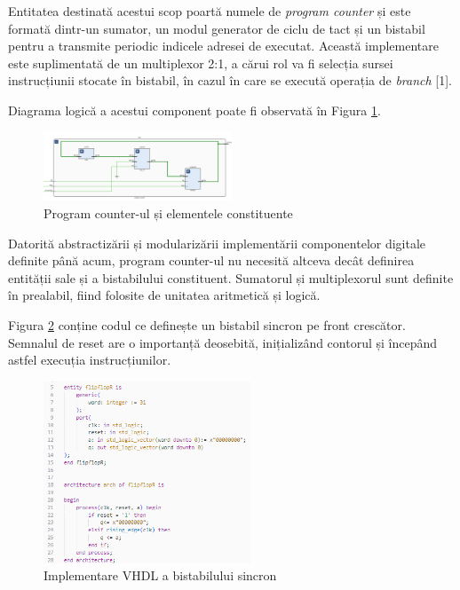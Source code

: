 \documentclass[12pt]{article}
\begin{document}
Entitatea destinată acestui scop poartă numele de \textit{program counter} și este formată dintr-un sumator, un modul generator de ciclu de tact și un bistabil pentru a transmite periodic indicele adresei de executat. Această implementare este suplimentată de un multiplexor 2:1, a cărui rol va fi selecția sursei instrucțiunii stocate în bistabil, în cazul în care se execută operația de  \textit{branch} [1].

Diagrama logică a acestui component poate fi observată în Figura \ref{Figura:36}.

 \begin{figure}[h!]
 \includegraphics[width=0.5\textwidth]{programcounter.png}
 \centering
 \caption{Program counter-ul și elementele constituente}
 \label{Figura:36}
 \end{figure}

 Datorită abstractizării și modularizării implementării componentelor digitale definite până acum, program counter-ul nu necesită altceva decât definirea entității sale și a bistabilului constituent. Sumatorul și multiplexorul sunt definite în prealabil, fiind folosite de unitatea aritmetică și logică.
 
Figura  \ref{Figura:37} conține codul ce definește un bistabil sincron pe front crescător. Semnalul de reset are o importanță deosebită, inițializând contorul și începând astfel execuția instrucțiunilor.
  \begin{figure}[h!]
 \includegraphics[width=0.55\textwidth]{bistabilcode.png}
 \centering
 \caption{Implementare VHDL a bistabilului sincron}
 \label{Figura:37}
 \end{figure}
\end{document}
